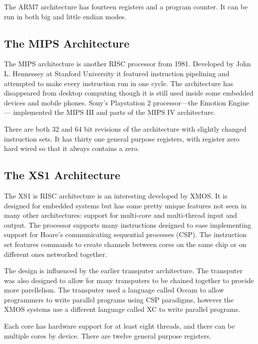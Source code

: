 \documentclass[10pt,]{book}
\begin{document}
The ARM7 architecture has fourteen registers and a program counter. It
can be run in both big and little endian modes.

\subsection{The MIPS Architecture}

The MIPS architecture is another RISC processor from 1981. Developed by
John L. Hennessey at Stanford University it featured instruction
pipelining and attempted to make every instruction run in one cycle. The
architecture has disappeared from desktop computing though it is still
used inside some embedded devices and mobile
phones\autocite{Merritt:2012wy}. Sony's Playstation 2 processor---the
Emotion Engine--- implemented the MIPS III and parts of the MIPS IV
architecture.

There are both 32 and 64 bit revisions of the architecture with slightly
changed instruction sets. It has thirty one general purpose registers,
with register zero hard wired so that it always contains a zero.

\subsection{The XS1 Architecture}

The XS1 is RISC architecture is an interesting developed by XMOS. It is
designed for embedded systems but has some pretty unique features not
seen in many other architectures: support for multi-core and
multi-thread input and output. The processor supports many instructions
designed to ease implementing support for Hoare's communicating
sequential processes (CSP)\autocite{Hoare:1978ww}. The instruction set
features commands to create channels between cores on the same chip or
on different ones networked together\autocite{May:ua}.

The design is influenced by the earlier transputer architecture. The
transputer was also designed to allow for many transputers to be chained
together to provide more parellelism\autocite{May:1990kg}. The
transputer used a language called Occam to allow programmers to write
parallel programs using CSP paradigms\autocite{Gaudiot:1987wp}, however
the XMOS systems use a different language called
XC\autocite{Watt:2009ub} to write parallel programs.

Each core has hardware support for at least eight
threads\autocite{XMOS:2011tu}, and there can be multiple cores by
device. There are twelve general purpose registers.
\end{document}
